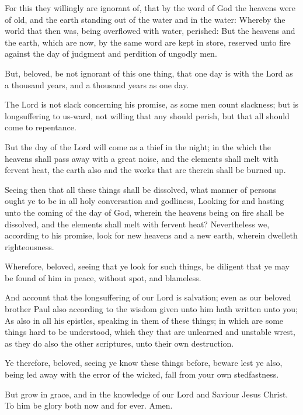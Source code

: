 \verse For this they willingly are ignorant of, that by the word of God the heavens were of old, and the earth standing out of the water and in the water: \verse Whereby the world that then was, being overflowed with water, perished: \verse But the heavens and the earth, which are now, by the same word are kept in store, reserved unto fire against the day of judgment and perdition of ungodly men.

\verse But, beloved, be not ignorant of this one thing, that one day is with the Lord as a thousand years, and a thousand years as one day.

\verse The Lord is not slack concerning his promise, as some men count slackness; but is longsuffering to us-ward, not willing that any should perish, but that all should come to repentance.

\verse But the day of the Lord will come as a thief in the night; in the which the heavens shall pass away with a great noise, and the elements shall melt with fervent heat, the earth also and the works that are therein shall be burned up.

\verse Seeing then that all these things shall be dissolved, what manner of persons ought ye to be in all holy conversation and godliness, \verse Looking for and hasting unto the coming of the day of God, wherein the heavens being on fire shall be dissolved, and the elements shall melt with fervent heat?  \verse Nevertheless we, according to his promise, look for new heavens and a new earth, wherein dwelleth righteousness.

\verse Wherefore, beloved, seeing that ye look for such things, be diligent that ye may be found of him in peace, without spot, and blameless.

\verse And account that the longsuffering of our Lord is salvation; even as our beloved brother Paul also according to the wisdom given unto him hath written unto you; \verse As also in all his epistles, speaking in them of these things; in which are some things hard to be understood, which they that are unlearned and unstable wrest, as they do also the other scriptures, unto their own destruction.

\verse Ye therefore, beloved, seeing ye know these things before, beware lest ye also, being led away with the error of the wicked, fall from your own stedfastness.

\verse But grow in grace, and in the knowledge of our Lord and Saviour Jesus Christ. To him be glory both now and for ever. Amen.


